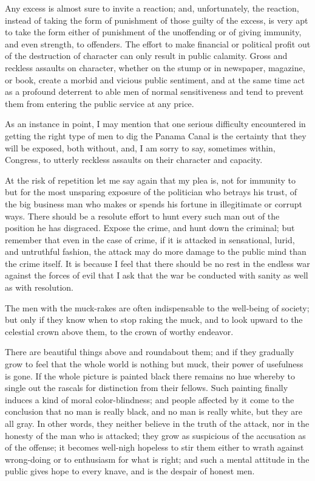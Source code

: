 \documentclass[a4paper]{amsbook}
\begin{document}
Any excess is almost sure to invite a reaction; and, unfortunately, the reaction, instead of taking the form of punishment of those guilty of the excess, is very apt to take the form either of punishment of the unoffending or of giving immunity, and even strength, to offenders. The effort to make financial or political profit out of the destruction of character can only result in public calamity. Gross and reckless assaults on character, whether on the stump or in newspaper, magazine, or book, create a morbid and vicious public sentiment, and at the same time act as a profound deterrent to able men of normal sensitiveness and tend to prevent them from entering the public service at any price.

As an instance in point, I may mention that one serious difficulty encountered in getting the right type of men to dig the Panama Canal is the certainty that they will be exposed, both without, and, I am sorry to say, sometimes within, Congress, to utterly reckless assaults on their character and capacity.

At the risk of repetition let me say again that my plea is, not for immunity to but for the most unsparing exposure of the politician who betrays his trust, of the big business man who makes or spends his fortune in illegitimate or corrupt ways. There should be a resolute effort to hunt every such man out of the position he has disgraced. Expose the crime, and hunt down the criminal; but remember that even in the case of crime, if it is attacked in sensational, lurid, and untruthful fashion, the attack may do more damage to the public mind than the crime itself. It is because I feel that there should be no rest in the endless war against the forces of evil that I ask that the war be conducted with sanity as well as with resolution.

The men with the muck-rakes are often indispensable to the well-being of society; but only if they know when to stop raking the muck, and to look upward to the celestial crown above them, to the crown of worthy endeavor.

There are beautiful things above and roundabout them; and if they gradually grow to feel that the whole world is nothing but muck, their power of usefulness is gone. If the whole picture is painted black there remains no hue whereby to single out the rascals for distinction from their fellows. Such painting finally induces a kind of moral color-blindness; and people affected by it come to the conclusion that no man is really black, and no man is really white, but they are all gray. In other words, they neither believe in the truth of the attack, nor in the honesty of the man who is attacked; they grow as suspicious of the accusation as of the offense; it becomes well-nigh hopeless to stir them either to wrath against wrong-doing or to enthusiasm for what is right; and such a mental attitude in the public gives hope to every knave, and is the despair of honest men.
\end{document}
